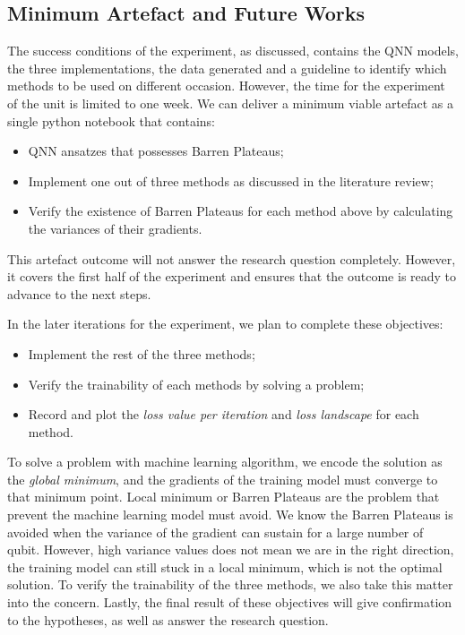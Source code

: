 \subsection{Minimum Artefact and Future Works}
\label{Minimum Artefacts}

The success conditions of the experiment, as discussed, contains the QNN models, the three implementations, the data generated and a guideline to identify which methods to be used on different occasion.
However, the time for the experiment of the unit is limited to one week. We can deliver a minimum viable artefact as a single python notebook that contains:
\begin{itemize}
    \item QNN ansatzes that possesses Barren Plateaus;
    \item Implement one out of three methods as discussed in the literature review;
    \item Verify the existence of Barren Plateaus for each method above by calculating the variances of their gradients.
\end{itemize}

This artefact outcome will not answer the research question completely.
However, it covers the first half of the experiment and ensures that the outcome is ready to advance to the next steps.

In the later iterations for the experiment, we plan to complete these objectives:
\begin{itemize}
    \item Implement the rest of the three methods;
    \item Verify the trainability of each methods by solving a problem;
    \item Record and plot the \textit{loss value per iteration} and \textit{loss landscape} for each method.
\end{itemize}

To solve a problem with machine learning algorithm, we encode the solution as the \textit{global minimum}, and the gradients of the training model must converge to that minimum point.
Local minimum or Barren Plateaus are the problem that prevent the machine learning model must avoid.
We know the Barren Plateaus is avoided when the variance of the gradient can sustain for a large number of qubit.
However, high variance values does not mean we are in the right direction, the training model can still stuck in a local minimum, which is not the optimal solution.
To verify the trainability of the three methods, we also take this matter into the concern.
Lastly, the final result of these objectives will give confirmation to the hypotheses, as well as answer the research question.
